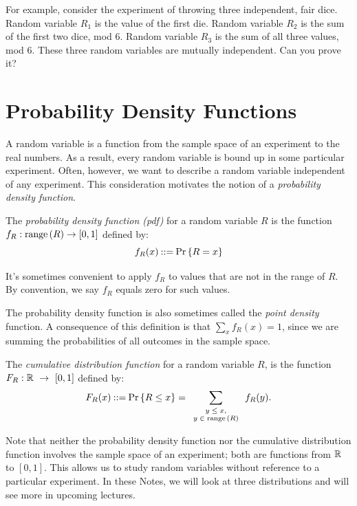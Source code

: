 \documentclass[11pt,twoside]{article}
\begin{document}
For example, consider the experiment of throwing three independent, fair
dice.  Random variable $R_1$ is the value of the first die.  Random
variable $R_2$ is the sum of the first two dice, mod 6.  Random variable
$R_3$ is the sum of all three values, mod 6.  These three random variables
are mutually independent.  Can you prove it?

\section{Probability Density Functions}

A random variable is a function from the sample space of an experiment to
the real numbers.  As a result, every random variable is bound up in some
particular experiment.  Often, however, we want to describe a random
variable independent of any experiment.  This consideration motivates the
notion of a \emph{probability density function}.


\begin{definition}
The \emph{probability density function (pdf)} for a random variable $R$ is
the function $f_R : \mathop{\textup{range}}\nolimits\left(R\right) \to [0, 1]$ defined by:
\[
f_R(x) \mathbin{::=} \mathop{\textup{Pr}}\nolimits\left\{R = x\right\}
\]
\end{definition}
It's sometimes convenient to apply $f_R$ to values that are not in the
range of $R$.  By convention, we say $f_R$ equals zero for such values.

The probability density function is also sometimes called the
\emph{point density} function.  A consequence of this definition is
that $\sum_x f_R(x) = 1$, since we are summing the probabilities of all
outcomes in the sample space.

\begin{definition}
The \emph{cumulative distribution function} for a random variable $R$, is
the function $F_R: \mathbb{R}~\to~[0, 1]$ defined by:
\[
F_R(x) \mathbin{::=} \mathop{\textup{Pr}}\nolimits\left\{R \leq x\right\} = \sum_{\text{\scriptsize{$\begin{array}{c}
                                         y \leq x,\\
                                         y \in \mathop{\textup{range}}\nolimits\left(R\right)
                                         \end{array}$}}}   f_R(y).
\]
\end{definition}
Note that neither the probability density function nor the cumulative
distribution function involves the sample space of an experiment; both are
functions from $\mathbb{R}$ to $[0, 1]$.  This allows us to study random
variables without reference to a particular experiment.  In these Notes,
we will look at three distributions and will see more in upcoming
lectures.
\end{document}
